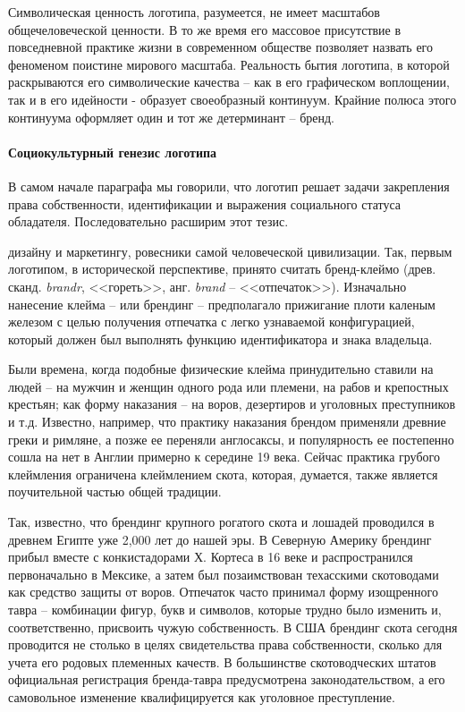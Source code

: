 Символическая ценность логотипа, разумеется, не имеет масштабов общечеловеческой ценности.
В то же время его массовое присутствие в повседневной практике жизни в современном
обществе позволяет назвать его феноменом поистине мирового масштаба. Реальность
бытия логотипа, в которой раскрываются его символические качества -- как в его графическом
воплощении, так и в его идейности - образует своеобразный континуум.
Крайние полюса этого континуума оформляет один и тот же детерминант -- бренд.

\paragraph{Социокультурный генезис логотипа}

В самом начале параграфа мы говорили, что логотип решает задачи закрепления права
собственности, идентификации и выражения социального статуса обладателя.
Последовательно расширим этот тезис.

дизайну и маркетингу, ровесники самой человеческой цивилизации. Так, первым логотипом,
в исторической перспективе, принято считать бренд-клеймо (древ. сканд. \emph{brandr},
<<гореть>>, анг. \emph{brand} -- <<отпечаток>>).
\autocite{markritson}\autocite{colapinto2011}\autocite{tradetimeline}\autocite{zapenko2007}
Изначально нанесение клейма -- или брендинг -- предполагало прижигание плоти
каленым железом с целью получения отпечатка с легко узнаваемой конфигурацией,
который должен был выполнять функцию идентификатора и знака владельца.

Были времена, когда подобные физические клейма принудительно ставили на людей --
на мужчин и женщин одного рода или племени, на рабов и крепостных крестьян;
как форму наказания -- на воров, дезертиров и уголовных преступников и т.д.
Известно, например, что практику наказания брендом применяли древние греки и
римляне, а позже ее переняли англосаксы, и популярность ее постепенно сошла на
нет в Англии примерно к середине 19 века. Сейчас практика грубого клеймления ограничена
клеймлением скота, которая, думается, также является поучительной  частью общей традиции.

Так, известно, что брендинг крупного рогатого скота и лошадей проводился в древнем
Египте уже 2,000 лет до нашей эры. В Северную Америку брендинг прибыл вместе с
конкистадорами Х. Кортеса в 16 веке и распространился первоначально в Мексике,
а затем был позаимствован техасскими скотоводами как средство защиты от воров.
Отпечаток часто принимал форму изощренного тавра -- комбинации фигур, букв и символов,
которые трудно было изменить и, соответственно, присвоить чужую собственность.
В США брендинг скота сегодня проводится не столько в целях свидетельства права
собственности, сколько для учета его родовых племенных качеств. В большинстве
скотоводческих штатов официальная регистрация бренда-тавра предусмотрена
законодательством, а его самовольное изменение квалифицируется как уголовное
преступление\autocite{1994encarta}.

